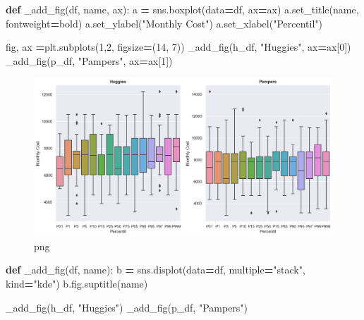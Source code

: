 \documentclass[
]{article}
\newenvironment{Shaded}{\begin{snugshade}}{\end{snugshade}}
\newcommand{\DecValTok}[1]{\textcolor[rgb]{0.00,0.00,0.81}{#1}}
\newcommand{\KeywordTok}[1]{\textcolor[rgb]{0.13,0.29,0.53}{\textbf{#1}}}
\newcommand{\NormalTok}[1]{#1}
\newcommand{\OperatorTok}[1]{\textcolor[rgb]{0.81,0.36,0.00}{\textbf{#1}}}
\newcommand{\StringTok}[1]{\textcolor[rgb]{0.31,0.60,0.02}{#1}}
\begin{document}
\begin{Shaded}
\begin{Highlighting}[]
\KeywordTok{def}\NormalTok{ \_add\_fig(df, name, ax):}
\NormalTok{    a }\OperatorTok{=}\NormalTok{ sns.boxplot(data}\OperatorTok{=}\NormalTok{df, ax}\OperatorTok{=}\NormalTok{ax)}
\NormalTok{    a.set\_title(name, fontweight}\OperatorTok{=}\StringTok{\textquotesingle{}bold\textquotesingle{}}\NormalTok{)}
\NormalTok{    a.set\_ylabel(}\StringTok{"Monthly Cost"}\NormalTok{)}
\NormalTok{    a.set\_xlabel(}\StringTok{"Percentil"}\NormalTok{)}


\NormalTok{fig, ax }\OperatorTok{=}\NormalTok{plt.subplots(}\DecValTok{1}\NormalTok{,}\DecValTok{2}\NormalTok{, figsize}\OperatorTok{=}\NormalTok{(}\DecValTok{14}\NormalTok{, }\DecValTok{7}\NormalTok{))}
\NormalTok{\_add\_fig(h\_df, }\StringTok{"Huggies"}\NormalTok{, ax}\OperatorTok{=}\NormalTok{ax[}\DecValTok{0}\NormalTok{])}
\NormalTok{\_add\_fig(p\_df, }\StringTok{"Pampers"}\NormalTok{, ax}\OperatorTok{=}\NormalTok{ax[}\DecValTok{1}\NormalTok{])}
\end{Highlighting}
\end{Shaded}

\begin{figure}
\centering
\includegraphics{output_39_0.png}
\caption{png}
\end{figure}

\begin{Shaded}
\begin{Highlighting}[]
\KeywordTok{def}\NormalTok{ \_add\_fig(df, name):}
\NormalTok{    b }\OperatorTok{=}\NormalTok{ sns.displot(data}\OperatorTok{=}\NormalTok{df, multiple}\OperatorTok{=}\StringTok{"stack"}\NormalTok{, kind}\OperatorTok{=}\StringTok{"kde"}\NormalTok{)}
\NormalTok{    b.fig.suptitle(name)}

\NormalTok{\_add\_fig(h\_df, }\StringTok{"Huggies"}\NormalTok{)}
\NormalTok{\_add\_fig(p\_df, }\StringTok{"Pampers"}\NormalTok{)}
\end{Highlighting}
\end{Shaded}
\end{document}
